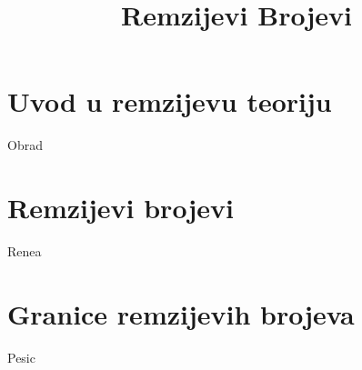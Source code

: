 \documentclass{article}
\title{Remzijevi Brojevi}
\begin{document}
	\maketitle
	\newpage
	
	\tableofcontents
	\newpage
	
	\section{Uvod u remzijevu teoriju}
	Obrad
	\section{Remzijevi brojevi}
	Renea
	\section{Granice remzijevih brojeva}
	Pesic
\end{document}
